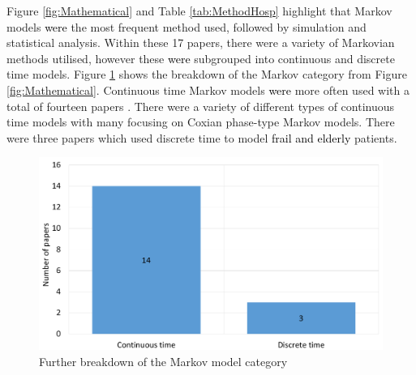 \documentclass[../thesis.tex]{subfiles}
\begin{document}
Figure \ref{fig:Mathematical} and Table \ref{tab:MethodHosp} highlight that Markov models \textcolor{black}{were} the most frequent method used, followed by simulation and statistical analysis. Within these 17 papers, there were a variety of Markovian methods utilised, however these \textcolor{black}{were} subgrouped into continuous and discrete time models. Figure \ref{Fig:markov} shows the breakdown of the Markov category from Figure \ref{fig:Mathematical}. Continuous time Markov models \textcolor{black}{were} more often used with a total of fourteen papers \cite{Christodoulou,Faddy,Franklin, Garg1, Gordon1, Gordon2, Hamdani, Marshall1, Marshall2, Marshall3,McClean, Shaw, Taylor, Xie}. There were a variety of different types of continuous time models with many focusing on Coxian phase-type Markov models. There were three papers which used discrete time \cite{Garg2,Hare, Patrick} to model \textcolor{black}{frail and elderly} patients.

\begin{figure}[H]
\centering
    \includegraphics[scale = 0.3]{Chapter2/Figures/Markov1.pdf}
 \caption{Further breakdown of the Markov model category}
 \label{Fig:markov}
\end{figure}
\end{document}
